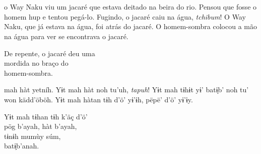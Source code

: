 \chapter*{}


 o Way Naku viu um
jacaré que estava deitado
na beira do rio. Pensou
que fosse o homem hup e
tentou pegá-lo. Fugindo,
o jacaré caiu na água,
\textit{tchibum}! O Way Naku,
que já estava na água,
foi atrás do jacaré. O
homem-sombra colocou a
mão na água para ver se
encontrava o jacaré.

\medskip

De repente, o jacaré deu uma\\
mordida no braço do\\
homem-sombra.

\vspace{2em}

 mah hàt yetníh. Yɨt
mah hàt noh tu’uh, \textit{tapuh}!
Yɨt mah tɨhɨt yɨ’ batɨ̗b’ noh
tu’ won kädd’öböh. Yɨt
mah hàtan tɨh d’ö’ yɨ’ɨh,
pëpë’ d’ö’ yɨ’ɨy.

\medskip

Yɨt mah tɨhan tɨh k’äç d’ö’\\
pög b’ayah, hàt b’ayah,\\
tɨnɨh mumùy súm,\\
batɨ̗b’anah.

\vspace*{\fill}

